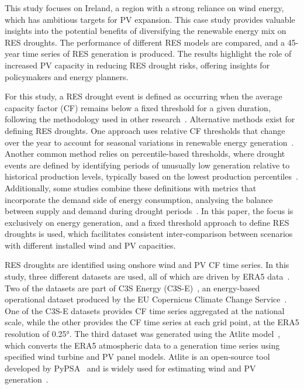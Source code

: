 \documentclass[a4paper, 11p1t]{article}
\begin{document}
This study focuses on Ireland, a region with a strong reliance on wind energy, which has ambitious targets for PV expansion. This case study provides valuable insights into the potential benefits of diversifying the renewable energy mix on RES droughts. The performance of different RES models are compared, and a 45-year time series of RES generation is produced. The results highlight the role of increased PV capacity in reducing RES drought risks, offering insights for policymakers and energy planners.

For this study, a RES drought event is defined as occurring when the average capacity factor (CF) remains below a fixed threshold for a given duration, following the methodology used in other research~\cite{kaspar2019drought, ohba2022drought, mockert2023drought, mayer2023drought}. Alternative methods exist for defining RES droughts. One approach uses relative CF thresholds that change over the year to account for seasonal variations in renewable energy generation~\cite{raynaud2018drought, rinaldi2021drought, gangopadhyay2022drought, allen2023drought, kapica2024drought}. Another common method relies on percentile-based thresholds, where drought events are defined by identifying periods of unusually low generation relative to historical production levels, typically based on the lowest production percentiles~\cite{bracken2024drought, allen2023drought}. Additionally, some studies combine these definitions with metrics that incorporate the demand side of energy consumption, analysing the balance between supply and demand during drought periods~\cite{raynaud2018drought, rinaldi2021drought, allen2023drought, bracken2024drought}. In this paper, the focus is exclusively on energy generation, and a fixed threshold approach to define RES droughts is used, which facilitates consistent inter-comparison between scenarios with different installed wind and PV capacities.

RES droughts are identified using onshore wind and PV CF time series. In this study, three different datasets are used, all of which are driven by ERA5 data~\cite{hersbach2020era5}. Two of the datasets are part of C3S Energy (C3S-E)~\cite{cds2023energy}, an energy-based operational dataset produced by the EU Copernicus Climate Change Service~\cite{dubus2023energy}. One of the C3S-E datasets provides CF time series aggregated at the national scale, while the other provides the CF time series at each grid point, at the ERA5 resolution of 0.25°. The third dataset was generated using the Atlite model~\cite{hofman2021atlite}, which converts the ERA5 atmospheric data to a generation time series using specified wind turbine and PV panel models. Atlite is an open-source tool developed by PyPSA~\cite{hofman2021atlite} and is widely used for estimating wind and PV generation~\cite{mockert2023drought, li2023atlite, parzen2023atlite, ali2023comparative}.
\end{document}
